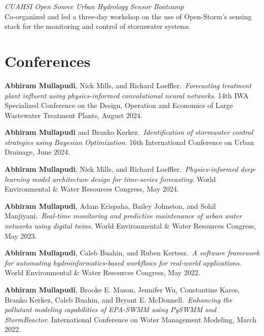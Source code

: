 \documentclass[a4paper,11pt]{article}
\newcommand{\years}[1]{%
  {\reversemarginpar\strut\marginnote{{\small#1}}}%
}
\begin{document}
\years{2017, 2019} \emph{CUAHSI Open Source Urban Hydrology Sensor Bootcamp}\\[.2cm]
Co-organized and led a three-day workshop on the use of Open-Storm's sensing stack
for the monitoring and control of stormwater systems.

\section*{Conferences}

\years{2024} \textbf{Abhiram Mullapudi}, Nick Mills, and Richard Loeffler.\ \emph{Forecasting treatment plant influent using physics-informed convolutional neural networks}. 14th IWA Specialized Conference on the Design, Operation and Economics of Large Wastewater Treatment Plants, August 2024.\\[.1cm]

\years{2024} \textbf{Abhiram Mullapudi} and Branko Kerkez.\ \emph{Identification of stormwater control strategies using Bayesian Optimization}. 16th International Conference on Urban Drainage, June 2024.\\[.1cm]

\years{2024} \textbf{Abhiram Mullapudi}, Nick Mills, and Richard Loeffler.\ \emph{Physics-informed deep-learning model architecture design for time-series forecasting}. World Environmental \& Water Resources Congress, May 2024.\\[.1cm]

\years{2023} \textbf{Abhiram Mullapudi}, Adam Erispaha, Bailey Johnston, and Sohil Manjiyani.\ \emph{Real-time monitoring and predictive maintenance of urban water networks using digital twins}. World Environmental \& Water Resources Congress, May 2023.\\[.1cm]

\years{2022} \textbf{Abhiram Mullapudi}, Caleb Buahin, and Ruben Kertesz.\ \emph{A software framework for automating hydroinformatics-based workflows for real-world applications}. World Environmental \& Water Resources Congress, May 2022.\\[.1cm]

\years{2022} \textbf{Abhiram Mullapudi}, Brooke E. Mason, Jennifer Wu, Constantine Karos, Branko
Kerkez, Caleb Buahin, and Bryant E. McDonnell.\ \emph{Enhancing the pollutant modeling capabilities of EPA-SWMM using PySWMM and StormReactor}. International Conference on Water Management Modeling, March 2022.\\[.1cm]
\end{document}
